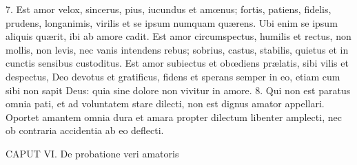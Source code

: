 \documentclass[twoside]{article}
\begin{document}
7. Est amor velox, sincerus, pius, iucundus et amœnus; fortis, patiens, fidelis, prudens, longanimis, virilis et se ipsum numquam quærens. Ubi enim se ipsum aliquis quærit, ibi ab amore cadit. Est amor circumspectus, humilis et rectus, non mollis, non levis, nec vanis intendens rebus; sobrius, castus, stabilis, quietus et in cunctis sensibus custoditus. Est amor subiectus et obœdiens prælatis, sibi vilis et despectus, Deo devotus et gratificus, fidens et sperans semper in eo, etiam cum sibi non sapit Deus: quia sine dolore non vivitur in amore.
8. Qui non est paratus omnia pati, et ad voluntatem stare dilecti, non est dignus amator appellari. Oportet amantem omnia dura et amara propter dilectum libenter amplecti, nec ob contraria accidentia ab eo deflecti.


CAPUT VI.
De probatione veri amatoris
\end{document}
